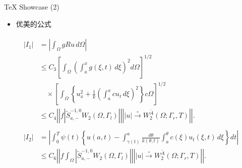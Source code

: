 \documentclass[dvipsnames, svgnames,
               mode=present, paper=screen,
               size=9pt, style=husky]{powerdot}
\newcommand{\wt}{\widetilde}
\newcommand{\envert}[1]{\left\lvert#1\right\rvert}
\let\abs=\envert
\begin{document}
\begin{slide}{\TeX{} Showcase (2)}
  \begin{itemize}
  \item 优美的公式
  \end{itemize}
{
\begin{align}
\begin{split}\abs{I_1}
  &=\left\lvert \int_\Omega gRu\,d\Omega\right\rvert\\
&\le C_3\left[\int_\Omega\left(\int_{a}^x
  g(\xi,t)\,d\xi\right)^2d\Omega\right]^{1/2}\\
&\quad\times \left[\int_\Omega\left\{u^2_x+\frac{1}{k}
  \left(\int_{a}^x cu_t\,d\xi\right)^2\right\}
  c\Omega\right]^{1/2}\\
&\le C_4\left\lvert \left\lvert f\left\lvert \wt{S}^{-1,0}_{a,-}
  W_2(\Omega,\Gamma_l)\right\rvert\right\rvert
  \left\lvert \abs{u}\overset{\circ}\to W_2^{\wt{A}}
  (\Omega;\Gamma_r,T)\right\rvert\right\rvert.
\end{split}\label{eq:A}\\[10pt]
\begin{split}\abs{I_2}&=\left\lvert \int_{0}^T \psi(t)\left\{u(a,t)
  -\int_{\gamma(t)}^a\frac{d\theta}{k(\theta,t)}
  \int_{a}^\theta c(\xi)u_t(\xi,t)\,d\xi\right\}dt\right\rvert\\
&\le C_6\left\lvert \left\lvert f\int_\Omega
 \left\lvert \wt{S}^{-1,0}_{a,-}
  W_2(\Omega,\Gamma_l)\right\rvert\right\rvert
  \left\lvert \abs{u}\overset{\circ}\to W_2^{\wt{A}}
  (\Omega;\Gamma_r,T)\right\rvert\right\rvert.
\end{split}
\end{align}}  
\end{slide}
\end{document}

